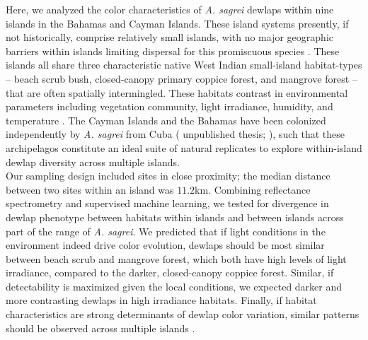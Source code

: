 Here, we analyzed the color characteristics of \textit{A. sagrei} dewlaps within nine islands in the Bahamas and Cayman Islands. These island systems presently, if not historically, comprise relatively small islands, with no major geographic barriers within islands limiting dispersal for this promiscuous species \citep{Kamath2018}. These islands all share three characteristic native West Indian small-island habitat-types -- beach scrub bush, closed-canopy primary coppice forest, and mangrove forest -- that are often spatially intermingled. These habitats contrast in environmental parameters including vegetation community, light irradiance, humidity, and temperature \citep{Howard1950, Schoener1968}. The Cayman Islands and the Bahamas have been colonized independently by \textit{A. sagrei} from Cuba (\citealt{vandeSchoot2016} unpublished thesis; \citealt{Reynolds2020}), such that these archipelagos constitute an ideal suite of natural replicates to explore within-island dewlap diversity across multiple islands.\\

Our sampling design included sites in close proximity; the median distance between two sites within an island was $11.2$km. Combining reflectance spectrometry and supervised machine learning, we tested for divergence in dewlap phenotype between habitats within islands and between islands across part of the range of \textit{A. sagrei}. We predicted that if light conditions in the environment indeed drive color evolution, dewlaps should be most similar between beach scrub and mangrove forest, which both have high levels of light irradiance, compared to the darker, closed-canopy coppice forest. Similar, if detectability is maximized given the local conditions, we expected darker and more contrasting dewlaps in high irradiance habitats. Finally, if habitat characteristics are strong determinants of dewlap color variation, similar patterns should be observed across multiple islands \citep{Losos2011}. 



